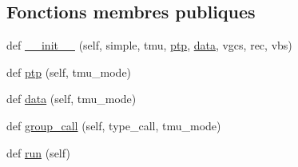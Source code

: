 \subsection*{Fonctions membres publiques}
\begin{DoxyCompactItemize}
\item 
def \hyperlink{classScript_1_1handOver_1_1MobileTransmitter_a2d85711a89b1b99cadb9d759d1d6072f}{\+\_\+\+\_\+init\+\_\+\+\_\+} (self, simple, tmu, \hyperlink{classScript_1_1handOver_1_1MobileTransmitter_a0cb158c80c1244e3379fe4eb91dad8fd}{ptp}, \hyperlink{classScript_1_1handOver_1_1MobileTransmitter_a5a0e39e384fabd4381f93ec60be74616}{data}, vgcs, rec, vbs)
\item 
def \hyperlink{classScript_1_1handOver_1_1MobileTransmitter_a0cb158c80c1244e3379fe4eb91dad8fd}{ptp} (self, tmu\+\_\+mode)
\item 
def \hyperlink{classScript_1_1handOver_1_1MobileTransmitter_a5a0e39e384fabd4381f93ec60be74616}{data} (self, tmu\+\_\+mode)
\item 
def \hyperlink{classScript_1_1handOver_1_1MobileTransmitter_aa94147ba15169a9f22363e2bab2e5cd9}{group\+\_\+call} (self, type\+\_\+call, tmu\+\_\+mode)
\item 
def \hyperlink{classScript_1_1handOver_1_1MobileTransmitter_aec021d2c9b7b289d100a056e21a730b8}{run} (self)
\end{DoxyCompactItemize}

